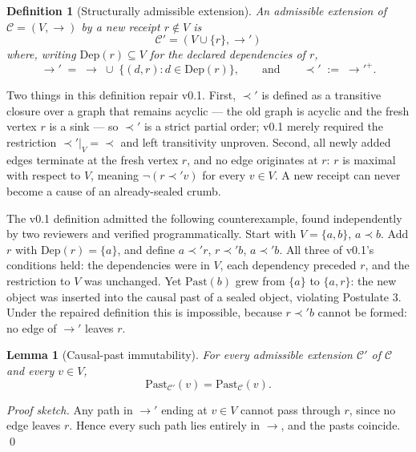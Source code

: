 \documentclass[11pt]{article}
\newtheorem{lemma}{Lemma}
\newtheorem{definition}{Definition}
\begin{document}
\begin{definition}[Structurally admissible extension]
An admissible extension of $\mathcal{C} = (V, \to)$ by a new receipt $r \notin V$ is
\[
\mathcal{C}' = (V \cup \{r\}, \to')
\]
where, writing $\mathrm{Dep}(r) \subseteq V$ for the declared dependencies of $r$,
\[
\to' \;=\; \to \;\cup\; \{(d, r) : d \in \mathrm{Dep}(r)\},
\qquad\text{and}\qquad \prec' \;:=\; {\to'}^+.
\]
\end{definition}

Two things in this definition repair v0.1. First, $\prec'$ is defined as a transitive closure over a graph that remains acyclic --- the old graph is acyclic and the fresh vertex $r$ is a sink --- so $\prec'$ is a strict partial order; v0.1 merely required the restriction $\prec'|_V = \prec$ and left transitivity unproven. Second, all newly added edges terminate at the fresh vertex $r$, and no edge originates at $r$: $r$ is maximal with respect to $V$, meaning $\neg(r \prec' v)$ for every $v \in V$. A new receipt can never become a cause of an already-sealed crumb.

The v0.1 definition admitted the following counterexample, found independently by two reviewers and verified programmatically. Start with $V = \{a, b\}$, $a \prec b$. Add $r$ with $\mathrm{Dep}(r) = \{a\}$, and define $a \prec' r$, $r \prec' b$, $a \prec' b$. All three of v0.1's conditions held: the dependencies were in $V$, each dependency preceded $r$, and the restriction to $V$ was unchanged. Yet $\mathrm{Past}(b)$ grew from $\{a\}$ to $\{a, r\}$: the new object was inserted into the causal past of a sealed object, violating Postulate 3. Under the repaired definition this is impossible, because $r \prec' b$ cannot be formed: no edge of $\to'$ leaves $r$.

\begin{lemma}[Causal-past immutability]
For every admissible extension $\mathcal{C}'$ of $\mathcal{C}$ and every $v \in V$,
\[
\mathrm{Past}_{\mathcal{C}'}(v) = \mathrm{Past}_{\mathcal{C}}(v).
\]
\end{lemma}

\textit{Proof sketch.} Any path in $\to'$ ending at $v \in V$ cannot pass through $r$, since no edge leaves $r$. Hence every such path lies entirely in $\to$, and the pasts coincide. \qed
\end{document}

